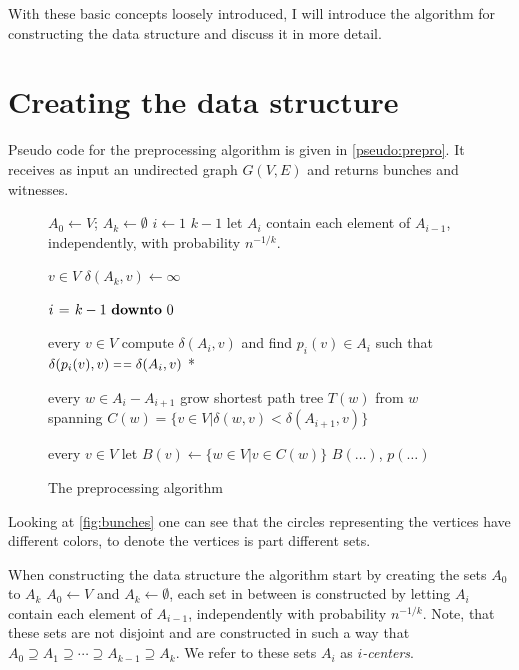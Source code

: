 With these basic concepts loosely introduced, I will introduce the algorithm
for constructing the data structure and discuss it in more detail.

\section{Creating the data structure}
\label{sec:ado:creation}
Pseudo code for the preprocessing algorithm  is given in
\autoref{pseudo:prepro}. It receives as input an undirected graph $G(V,E)$ and
returns bunches and witnesses.

\begin{figure}[htbp]
\begin{codebox}
    \li $A_{0}\gets V$; $A_{k}\gets \emptyset$ 
    \li \For $i \gets 1$ \To $k-1$
    \li \Do
            let $A_{i}$ contain each element of $A_{i-1}$,
    \zi     independently, with probability $n^{-1/k}$.
        \End

    \li \For $v \in V$ 
    \li \Do
            $\delta(A_{k}, v) \gets \infty$ 
        \End

    \li \For $i \gets k-1 \Downto 0$ 
    \li \Do

            \For every $v \in V$ 
    \li     \Do
                compute $\delta(A_{i},v)$ and find $p_{i}(v) \in A_{i}$ 
    \zi         such that $\delta(p_{i}(v),v) \isequal \delta(A_{i},v)$
    \zi     \Comment **
            \End

    \li     \For every $w \in A_{i} - A_{i+1}  $ 
    \li     \Do
                grow shortest path tree $T(w)$ from $w$
    \zi         spanning $C(w) = \{v \in V | \delta(w,v) < \delta(A_{i+1},v) \}$
            \End
        \End

    \li \For every $v \in V$ 
    \li \Do
        let $B(v) \gets \{w \in V | v \in C(w) \}$
        \End
    \li \Return $B(\dots)$, $p(\dots)$
\end{codebox}
\caption{The preprocessing algorithm}
\label{pseudo:prepro}
\end{figure}
Looking at \autoref{fig:bunches} one can see that the circles representing the
vertices have different colors, to denote the vertices is part different sets.

When constructing the data structure the algorithm start by creating the
sets $A_0$ to $A_{k}$ $A_0 \gets V$ and $A_{k} \gets \emptyset$, each set in
between is constructed by letting $A_i$ contain each element of $A_{i-1}$,
independently with probability $n^{-1/k}$. Note, that these sets are not
disjoint and are constructed in such a way that $A_{0} \supseteq A_1 \supseteq
\cdots \supseteq A_{k-1} \supseteq A_{k}$. We refer to these sets $A_i$ as
\emph{$i$-centers}.

